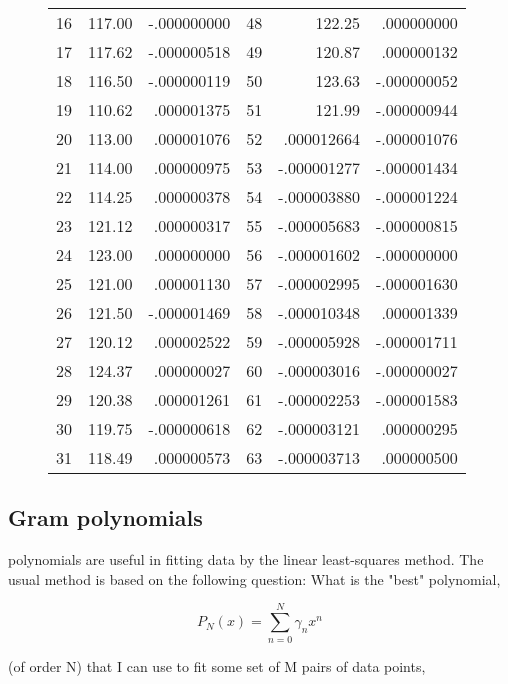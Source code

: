 \begin{figure}
\begin{tabular}{lrrlrr}
        16 &  117.00 & -.000000000 & 48 &  122.25     &  .000000000 \\
        17 &  117.62 & -.000000518 & 49 &  120.87     &  .000000132 \\
        18 &  116.50 & -.000000119 & 50 &  123.63     & -.000000052 \\
        19 &  110.62 &  .000001375 & 51 &  121.99     & -.000000944 \\
        20 &  113.00 &  .000001076 & 52 &  .000012664 & -.000001076 \\
        21 &  114.00 &  .000000975 & 53 & -.000001277 & -.000001434 \\
        22 &  114.25 &  .000000378 & 54 & -.000003880 & -.000001224 \\
        23 &  121.12 &  .000000317 & 55 & -.000005683 & -.000000815 \\
        24 &  123.00 &  .000000000 & 56 & -.000001602 & -.000000000 \\
        25 &  121.00 &  .000001130 & 57 & -.000002995 & -.000001630 \\
        26 &  121.50 & -.000001469 & 58 & -.000010348 &  .000001339 \\
        27 &  120.12 &  .000002522 & 59 & -.000005928 & -.000001711 \\
        28 &  124.37 &  .000000027 & 60 & -.000003016 & -.000000027 \\
        29 &  120.38 &  .000001261 & 61 & -.000002253 & -.000001583 \\
        30 &  119.75 & -.000000618 & 62 & -.000003121 &  .000000295 \\
        31 &  118.49 &  .000000573 & 63 & -.000003713 &  .000000500
    \end{tabular}
    \label{table:08_04}
\end{figure}

\subsection{Gram polynomials}
 polynomials are useful in fitting data by the linear least-squares method. The usual method is based on the following question: What is the "best" polynomial,

\begin{equation}
P_N(x) = \sum_{n=0}^N \gamma_n x^n
\end{equation}

(of order N) that I can use to fit some set of M pairs of data points,

